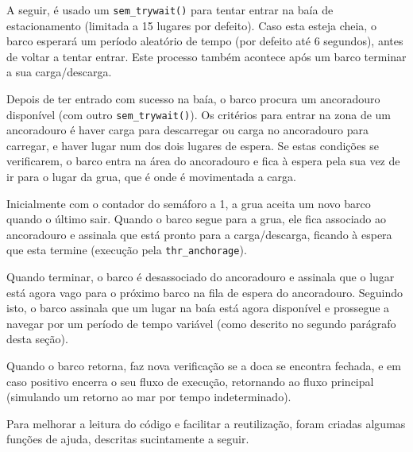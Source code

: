 \documentclass[12pt,a4paper]{report}
\begin{document}
A seguir, é usado um \verb+sem_trywait()+ para tentar entrar na baía de estacionamento (limitada a 15 lugares por defeito). Caso esta esteja cheia, o barco esperará um período aleatório de tempo (por defeito até 6 segundos), antes de voltar a tentar entrar. Este processo também acontece após um barco terminar a sua carga/descarga.

Depois de ter entrado com sucesso na baía, o barco procura um ancoradouro disponível (com outro \verb+sem_trywait()+). Os critérios para entrar na zona de um ancoradouro é haver carga para descarregar ou carga no ancoradouro para carregar, e haver lugar num dos dois lugares de espera. Se estas condições se verificarem, o barco entra na área do ancoradouro e fica à espera pela sua vez de ir para o lugar da grua, que é onde é movimentada a carga.

Inicialmente com o contador do semáforo a 1, a grua aceita um novo barco quando o último sair. Quando o barco segue para a grua, ele fica associado ao ancoradouro e assinala que está pronto para a carga/descarga, ficando à espera que esta termine (execução pela \verb+thr_anchorage+).

Quando terminar, o barco é desassociado do ancoradouro e assinala que o lugar está agora vago para o próximo barco na fila de espera do ancoradouro. Seguindo isto, o barco assinala que um lugar na baía está agora disponível e prossegue a navegar por um período de tempo variável (como descrito no segundo parágrafo desta seção).

Quando o barco retorna, faz nova verificação se a doca se encontra fechada, e em caso positivo encerra o seu fluxo de execução, retornando ao fluxo principal (simulando um retorno ao mar por tempo indeterminado).


Para melhorar a leitura do código e facilitar a reutilização, foram criadas algumas funções de ajuda, descritas sucintamente a seguir.

\newcommand{\func}[1]{\lstinline$#1$ \hfill}
\end{document}
